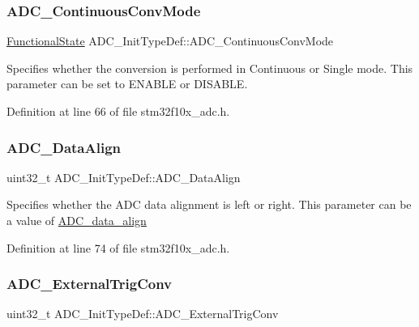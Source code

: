 \subsubsection{\texorpdfstring{A\+D\+C\+\_\+\+Continuous\+Conv\+Mode}{ADC\_ContinuousConvMode}}
{\footnotesize\ttfamily \hyperlink{group___exported__types_gac9a7e9a35d2513ec15c3b537aaa4fba1}{Functional\+State} A\+D\+C\+\_\+\+Init\+Type\+Def\+::\+A\+D\+C\+\_\+\+Continuous\+Conv\+Mode}

Specifies whether the conversion is performed in Continuous or Single mode. This parameter can be set to E\+N\+A\+B\+LE or D\+I\+S\+A\+B\+LE. 

Definition at line 66 of file stm32f10x\+\_\+adc.\+h.

\mbox{\label{struct_a_d_c___init_type_def_a622e89d8fba3900f20aaf40d5560ab7b}} 
\subsubsection{\texorpdfstring{A\+D\+C\+\_\+\+Data\+Align}{ADC\_DataAlign}}
{\footnotesize\ttfamily uint32\+\_\+t A\+D\+C\+\_\+\+Init\+Type\+Def\+::\+A\+D\+C\+\_\+\+Data\+Align}

Specifies whether the A\+DC data alignment is left or right. This parameter can be a value of \hyperlink{group___a_d_c__data__align}{A\+D\+C\+\_\+data\+\_\+align} 

Definition at line 74 of file stm32f10x\+\_\+adc.\+h.

\mbox{\label{struct_a_d_c___init_type_def_ae5d0c48e70c2a39355b7ab0cc1df8310}} 
\subsubsection{\texorpdfstring{A\+D\+C\+\_\+\+External\+Trig\+Conv}{ADC\_ExternalTrigConv}}
{\footnotesize\ttfamily uint32\+\_\+t A\+D\+C\+\_\+\+Init\+Type\+Def\+::\+A\+D\+C\+\_\+\+External\+Trig\+Conv}

